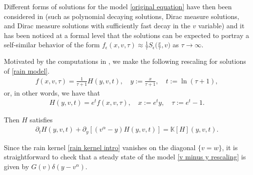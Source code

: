 \documentclass[11pt]{article}
\numberwithin{equation}{section}
\begin{document}
Different forms of solutions for the model \eqref{original equation} have then been considered in \cite[Section 6.5]{phdthesis} (such as polynomial decaying solutions, Dirac measure solutions, and Dirac measure solutions with sufficiently fast decay in the $v$ variable) and it has been noticed at a formal level that the solutions can be expected to portray a self-similar behavior of the form $f_{\epsilon}(x,v,\tau)\approx \frac{1}{\tau}S_{\epsilon}\big(\frac{x}{\tau},v\big)$ as $\tau\rightarrow \infty$.


Motivated by the computations in \cite{phdthesis}, we make the following rescaling for solutions of \eqref{rain model}.
\begin{align}
f(x,v,\tau)=\frac{1}{\tau+1}H(y,v,t), \quad y:=\frac{x}{\tau+1}, \quad t:= \ln(\tau+1),
\end{align}
or, in other words, we have that
\begin{align}
H(y,v,t)=e^{t}f(x,v,\tau), \quad x:=e^{t}y, \quad \tau:=e^{t}-1.
\end{align}

Then $H$ satisfies
\begin{align}\label{v minus y rescaling}
\partial_{t}H(y,v,t)+\partial_{y}[(v^{\alpha}-y)H(y,v,t)]=\mathbb{K}[H](y,v,t).
\end{align}

Since the rain kernel \eqref{rain kernel intro} vanishes on the diagonal $\{v=w\}$, it is straightforward to check that a steady state of the model \eqref{v minus y rescaling} is given by $G(v)\delta(y-v^{\alpha})$.  
\end{document}
